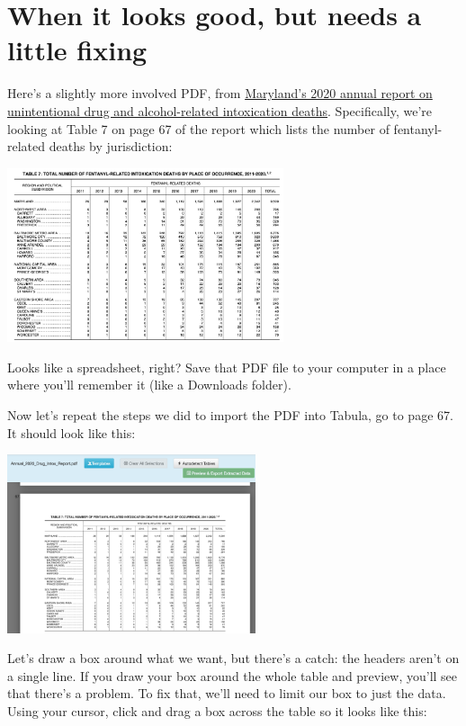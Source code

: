 \documentclass[
  letterpaper,
  DIV=11,
  numbers=noendperiod]{scrreprt}
\begin{document}
\hypertarget{when-it-looks-good-but-needs-a-little-fixing}{%
\section{When it looks good, but needs a little
fixing}\label{when-it-looks-good-but-needs-a-little-fixing}}

Here's a slightly more involved PDF, from
\href{https://health.maryland.gov/vsa/Documents/Overdose/Annual_2020_Drug_Intox_Report.pdf}{Maryland's
2020 annual report on unintentional drug and alcohol-related
intoxication deaths}. Specifically, we're looking at Table 7 on page 67
of the report which lists the number of fentanyl-related deaths by
jurisdiction:

\includegraphics[width=3.2in,height=\textheight]{./images/md_fentanyl_deaths_1.png}

Looks like a spreadsheet, right? Save that PDF file to your computer in
a place where you'll remember it (like a Downloads folder).

Now let's repeat the steps we did to import the PDF into Tabula, go to
page 67. It should look like this:

\includegraphics[width=2.88in,height=\textheight]{./images/md_fentanyl_deaths_2.png}

Let's draw a box around what we want, but there's a catch: the headers
aren't on a single line. If you draw your box around the whole table and
preview, you'll see that there's a problem. To fix that, we'll need to
limit our box to just the data. Using your cursor, click and drag a box
across the table so it looks like this:
\end{document}
